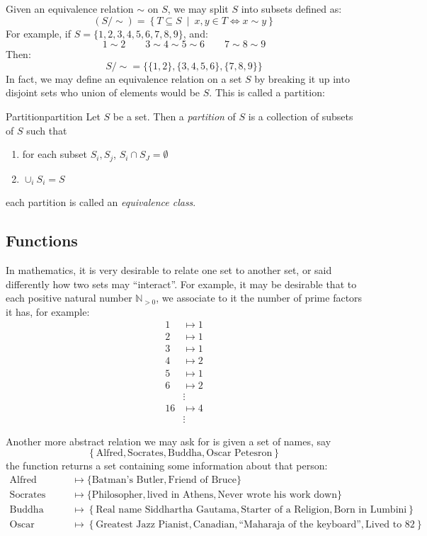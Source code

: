 \documentclass{book}
\newcommand{\N}{{\mathbb{N}}}
\newcommand{\sse}{\subseteq}
\newcommand{\set}[2]{\left\{#1 \ \middle|\ #2\right\}}
\begin{document}
Given an equivalence relation $\sim$ on $S$, we may split $S$ into subsets defined as:
\[
	(S/\sim) = \set{T \sse S}{x,y \in T \iff x\sim y}
\]
For example, if $S = \{1,2,3,4,5,6,7,8,9\}$, and:
\[
	1\sim 2 \qquad 3\sim 4\sim 5 \sim 6 \qquad 7\sim8\sim 9
\]
Then:
\[
	S/\sim = \{\{1,2\}, \{3,4,5,6\}, \{7,8,9\}\}
\]
In fact, we may define an equivalence relation on a set $S$ by breaking it up into disjoint sets who union of
elements would be $S$. This is called a partition:

\begin{defn}{Partition}{partition}
	Let $S$ be a set. Then a \emph{partition} of $S$ is a collection of subsets of $S$ such that
	\begin{enumerate}
		\item for each subset $S_i, S_j$, $S_i\cap S_J = \emptyset$
		\item $\cup_i S_i = S$
	\end{enumerate}
	each partition is called an \emph{equivalence class}.
\end{defn}


\subsection{Functions}\label{sec:functions}

In mathematics, it is very desirable to relate one set to another set, or said differently how two sets may
``interact''. For example, it may be desirable that
to each positive natural number $\N_{>0}$, we associate to it the number of prime factors it has, for example:
\begin{align*}
	1 &\mapsto 1\\
	2 &\mapsto 1\\
	3 &\mapsto 1\\
	4 &\mapsto 2\\
	5 &\mapsto 1\\
	6 &\mapsto 2\\
	  &\vdots \\
	16&\mapsto 4\\
	  &\vdots
\end{align*}

Another more abstract relation we may ask for is given a set of names, say
\[
	\left\{\text{Alfred},
	\text{Socrates}, \text{Buddha}, \text{Oscar Petesron}\right\}
\]
the function returns a set
containing some information about that person:
\begin{align*}
	\text{Alfred} &\mapsto \{\text{Batman's Butler}, \text{Friend of Bruce}\}\\
	\text{Socrates} &\mapsto \{\text{Philosopher}, \text{lived in Athens}, \text{Never wrote his
	work down}\}\\
			\text{Buddha} &\mapsto \left\{\text{Real name Siddhartha Gautama},
	\text{Starter of a Religion}, \text{Born in Lumbini}\right\}\\
				\text{Oscar Peterson} &\mapsto \left\{\text{Greatest Jazz Pianist},
		\text{Canadian}, \text{``Maharaja of the keyboard''}, \text{Lived to 82} \right\}
\end{align*}
\end{document}
